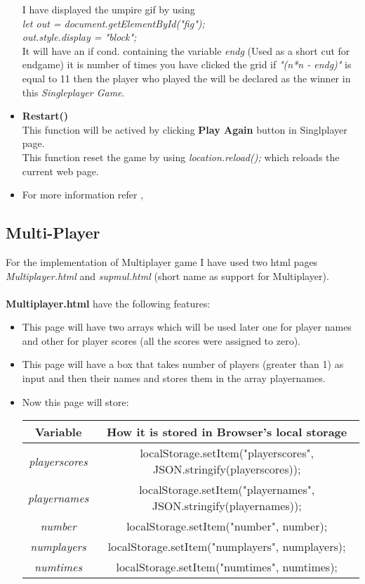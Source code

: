 \documentclass[a4paper, 11pt]{article}
\begin{document}
\begin{itemize}
        I have displayed the umpire gif by using \\ \textit{let out = document.getElementById("fig");\\out.style.display = "block";}
        \\ It will have an if cond. containing the variable \textit{endg} (Used as a short cut for endgame) it is number of times you have clicked the grid if \textit{"(n*n - endg)"} is equal to 11 then the player who played the will be declared as the winner in this \textit{Singleplayer Game}. 
        \item \textbf{Restart()}
        \\ This function will be actived by clicking \textbf{Play Again} button in Singlplayer page. \\ This function reset the game by using \textit{location.reload();} which reloads the current web page.
        \item For more information refer \cite{latex3}, \cite{latex4}

    \end{itemize}
    \subsection{Multi-Player}
    For the implementation of Multiplayer game I have used two html pages \textit{Multiplayer.html} and \textit{supmul.html} (short name as support for Multiplayer).\\\\ \textbf{Multiplayer.html} have the following features:\\
    \begin{itemize}
        \item  This page will have two arrays which will be used later one for player names and other for player scores (all the scores were assigned to zero).
        \item  This page will have a box that takes number of players (greater than 1) as input and then their names and stores them in the array playernames.
        \item Now this page will store: \\ 
        
        \begin{tabular}{|c|c|}
        \hline
        \textbf{Variable} & \textbf{How it is stored in Browser's local storage} \\
        \hline
        \textit{playerscores} & localStorage.setItem("playerscores", JSON.stringify(playerscores)); \\ \hline
        \textit{playernames} & localStorage.setItem("playernames", JSON.stringify(playernames));\\ \hline
        \textit{number} & localStorage.setItem("number", number); \\ \hline
        \textit{numplayers} & localStorage.setItem("numplayers", numplayers);\\ \hline
        \textit{numtimes} & localStorage.setItem("numtimes", numtimes);\\
        \hline 
        \end{tabular}
    \end{itemize}
\pagebreak
\end{document}
